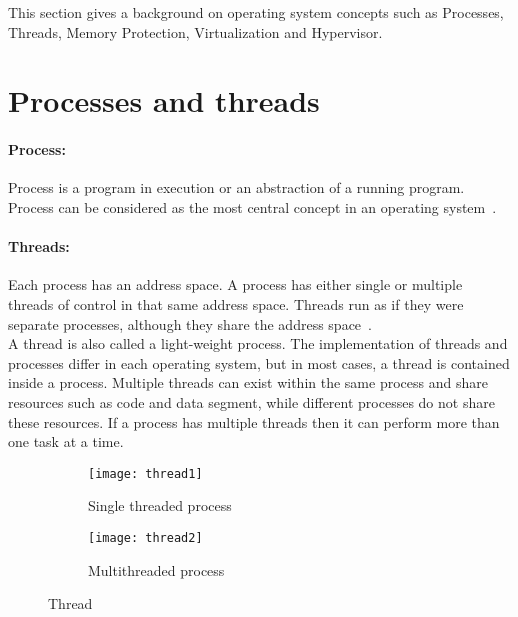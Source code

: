 This section gives a background on operating system concepts such as Processes, Threads, Memory Protection, Virtualization and Hypervisor.
\section{Processes and threads}
\paragraph{Process:} Process is a program in execution or an abstraction of a running program. Process can be considered as the most central concept in an operating system~\cite{Galvin}.

\paragraph{Threads:} Each process has an address space. A process has either single or multiple threads of control in that same address space. Threads run as if they were separate processes, although they share the address space~\cite{Galvin}.
\\
A thread is also called a light-weight process. The implementation of threads and processes differ in each operating system, but in most cases, a thread is contained inside a process. Multiple threads can exist within the same process and share resources such as code and data segment, while different processes do not share these resources. If a process has multiple threads then it can perform more than one task at a time.
\begin{figure}[!ht]
    \centering
    \begin{subfigure}[b]{0.45\textwidth}
	\texttt{[image: thread1]}
	\caption{Single threaded process}
	\label{fig:thread1}
    \end{subfigure}
	\hfill
    \begin{subfigure}[b]{0.45\textwidth}
	\texttt{[image: thread2]}
	\caption{Multithreaded process}
	\label{fig:thread2}
    \end{subfigure}
    \caption{Thread}\label{fig:threads}
\end{figure}

